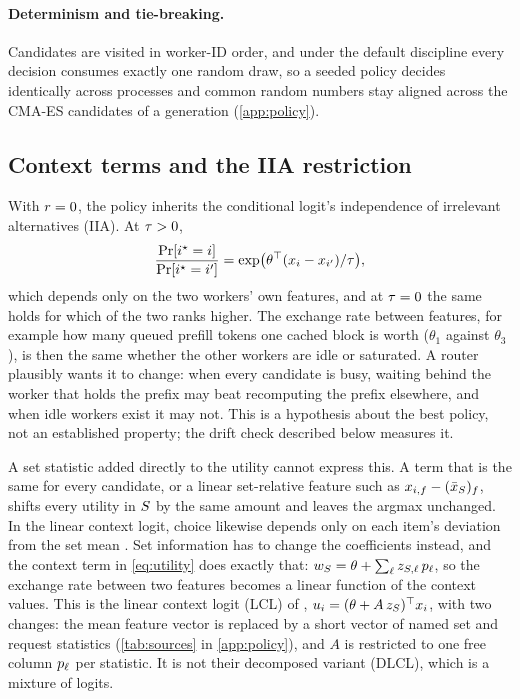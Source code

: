 \paragraph{Determinism and tie-breaking.}
Candidates are visited in worker-ID order, and under the default  discipline every
decision consumes exactly one random draw, so a seeded policy decides identically across processes
and common random numbers stay aligned across the CMA-ES candidates of a generation
(\cref{app:policy}).

\subsection{Context terms and the IIA restriction}
\label{sec:context}

With $r = 0$, the policy inherits the conditional logit's independence of irrelevant
alternatives (IIA). At $\tau > 0$,
\begin{equation}
  \label{eq:iia}
  \frac{\Pr[i^{\star} = i]}{\Pr[i^{\star} = i']} = \exp\!\big(\theta^{\top}(x_i - x_{i'})/\tau\big),
\end{equation}
which depends only on the two workers' own features, and at $\tau = 0$ the same holds for which of
the two ranks higher. The exchange rate between features, for example how many queued prefill
tokens one cached block is worth ($\theta_1$ against $\theta_3$), is then the same whether the
other workers are idle or saturated. A router plausibly wants it to change: when every candidate
is busy, waiting behind the worker that holds the prefix may beat recomputing the prefix
elsewhere, and when idle workers exist it may not. This is a hypothesis about the best policy,
not an established property; the drift check described below measures it.

A set statistic added directly to the utility cannot express this. A term that is the same for
every candidate, or a linear set-relative feature such as $x_{i,f} - (\bar{x}_{S})_f$, shifts every
utility in $S$ by the same amount and leaves the argmax unchanged. In the linear context
logit, choice likewise depends only on each item's deviation from the set mean
\citep[Lemma~4.3]{tomlinson2021lcl}. Set information has to change the coefficients instead, and
the context term in \cref{eq:utility} does exactly that: $w_{S} = \theta + \sum_\ell
z_{S,\ell}\,p_\ell$, so the exchange rate between two features becomes a linear function
of the context values. This is the linear context logit (LCL) of \citet{tomlinson2021lcl},
$u_i = (\theta + A\,z_{S})^{\top}x_i$, with two changes: the mean feature vector is
replaced by a short vector of named set and request statistics (\cref{tab:sources} in
\cref{app:policy}), and $A$ is restricted to one free column $p_\ell$ per statistic. It is not
their decomposed variant (DLCL), which is a mixture of logits.

